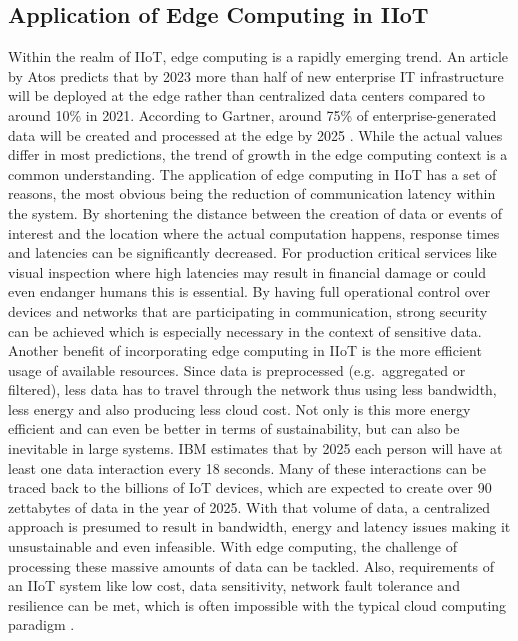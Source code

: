     \subsection{Application of Edge Computing in IIoT}
        Within the realm of IIoT, edge computing is a rapidly emerging trend. An article by Atos predicts that by 2023 more than half of new enterprise IT infrastructure will be deployed at the edge rather than centralized data centers compared to around 10\% in 2021. According to Gartner, around 75\% of enterprise-generated data will be created and processed at the edge by 2025 \cite{atos_2021_2021}. While the actual values differ in most predictions, the trend of growth in the edge computing context is a common understanding. The application of edge computing in IIoT has a set of reasons, the most obvious being the reduction of communication latency within the system. By shortening the distance between the creation of data or events of interest and the location where the actual computation happens, response times and latencies can be significantly decreased. For production critical services like visual inspection where high latencies may result in financial damage or could even endanger humans this is essential. By having full operational control over devices and networks that are participating in communication, strong security can be achieved which is especially necessary in the context of sensitive data. Another benefit of incorporating edge computing in IIoT is the more efficient usage of available resources. Since data is preprocessed (e.g.\ aggregated or filtered), less data has to travel through the network thus using less bandwidth, less energy and also producing less cloud cost. Not only is this more energy efficient and can even be better in terms of sustainability, but can also be inevitable in large systems. IBM estimates that by 2025 each person will have at least one data interaction every 18 seconds. Many of these interactions can be traced back to the billions of IoT devices, which are expected to create over 90 zettabytes of data in the year of 2025. With that volume of data, a centralized approach is presumed to result in bandwidth, energy and latency issues making it unsustainable and even infeasible. With edge computing, the challenge of processing these massive amounts of data can be tackled. Also, requirements of an IIoT system like low cost, data sensitivity, network fault tolerance and resilience can be met, which is often impossible with the typical cloud computing paradigm
        \cite{perez_edge_2022, %
        ibm_betting_edge_computing}.  %

